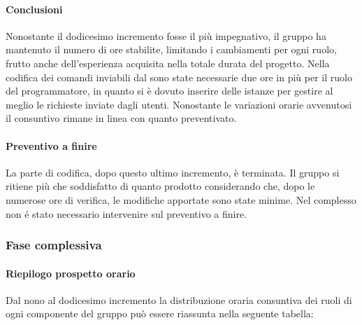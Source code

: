 		\paragraph{Conclusioni}
		Nonostante il dodicesimo incremento fosse il più impegnativo, il gruppo ha mantenuto il numero di ore stabilite, limitando i cambiamenti per ogni ruolo, frutto anche dell'esperienza acquisita nella totale durata del progetto. Nella codifica dei comandi inviabili dal  sono state necessarie due ore in più per il ruolo del programmatore, in quanto si è dovuto inserire delle istanze  per gestire al meglio le richieste inviate dagli utenti. Nonostante le variazioni orarie avvenutosi il consuntivo rimane in linea con quanto preventivato.
		
		\paragraph{Preventivo a finire}
		La parte di codifica, dopo questo ultimo incremento, è terminata. Il gruppo si ritiene più che soddisfatto di quanto prodotto considerando che, dopo le numerose ore di verifica, le modifiche apportate sono state minime. Nel complesso non é stato necessario intervenire sul preventivo a finire.
		\pagebreak
		
		
		\subsubsection{Fase complessiva}
		
		\paragraph{Riepilogo prospetto orario}
		Dal nono al dodicesimo incremento la distribuzione oraria consuntiva dei ruoli di ogni componente del gruppo può essere riassunta nella seguente tabella:
			
